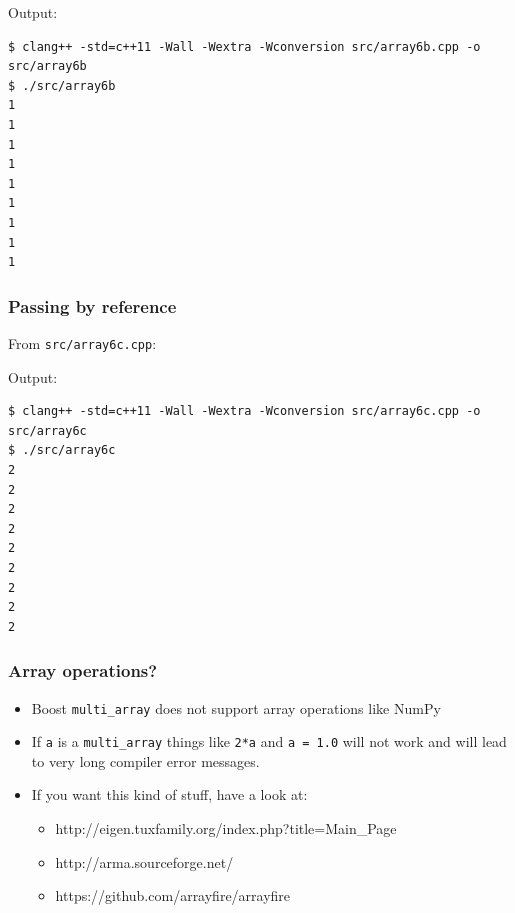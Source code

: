 \documentclass[12pt,letterpaper,twoside]{article}
\begin{document}
Output:

\begin{verbatim}
$ clang++ -std=c++11 -Wall -Wextra -Wconversion src/array6b.cpp -o src/array6b
$ ./src/array6b
1
1
1
1
1
1
1
1
1
\end{verbatim}

\hypertarget{passing-by-reference}{%
\subsubsection{Passing by reference}\label{passing-by-reference}}

From \texttt{src/array6c.cpp}:

\begin{Shaded}
\begin{Highlighting}[]
\NormalTok{, }
  \NormalTok{ (} 
    \NormalTok{ (} 
\NormalTok{    \}}
\NormalTok{  \}}
\NormalTok{\}}
\end{Highlighting}
\end{Shaded}

Output:

\begin{verbatim}
$ clang++ -std=c++11 -Wall -Wextra -Wconversion src/array6c.cpp -o src/array6c
$ ./src/array6c
2
2
2
2
2
2
2
2
2
\end{verbatim}

\hypertarget{array-operations}{%
\subsubsection{Array operations?}\label{array-operations}}

\begin{itemize}
\item
  Boost \texttt{multi\_array} does not support array operations like
  NumPy
\item
  If \texttt{a} is a \texttt{multi\_array} things like \texttt{2*a} and
  \texttt{a\ =\ 1.0} will not work and will lead to very long compiler
  error messages.
\item
  If you want this kind of stuff, have a look at:

  \begin{itemize}
  \item
    http://eigen.tuxfamily.org/index.php?title=Main\_Page
  \item
    http://arma.sourceforge.net/
  \item
    https://github.com/arrayfire/arrayfire
  \end{itemize}
\end{itemize}
\end{document}
